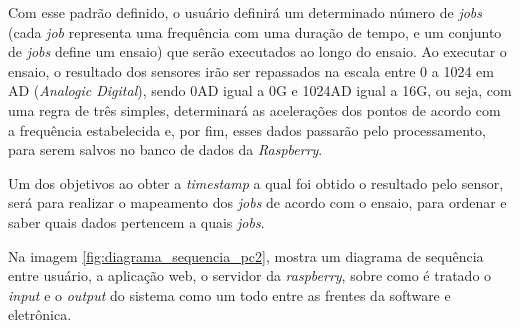 Com esse padrão definido, o usuário definirá um determinado número de \textit{jobs} (cada \textit{job} representa uma frequência com uma duração de tempo, 
e um conjunto de \textit{jobs} define um ensaio) que serão executados ao longo do ensaio. Ao executar o ensaio, o resultado dos sensores irão ser 
repassados na escala entre 0 a 1024 em AD (\textit{Analogic Digital}), sendo 0AD igual a 0G e 1024AD igual a 16G, ou seja, com uma regra de três simples,
determinará as acelerações dos pontos de acordo com a frequência estabelecida e, por fim, esses dados passarão pelo processamento, para serem salvos no 
banco de dados da \textit{Raspberry}.

Um dos objetivos ao obter a \textit{timestamp} a qual foi obtido o resultado pelo sensor, será para realizar o mapeamento dos \textit{jobs} de acordo 
com o ensaio, para ordenar e saber quais dados pertencem a quais \textit{jobs}.

Na imagem \ref{fig:diagrama_sequencia_pc2}, mostra um diagrama de sequência entre usuário, a aplicação web, o servidor da \textit{raspberry}, sobre 
como é tratado o \textit{input} e o \textit{output} do sistema como um todo entre as frentes da software e eletrônica.

